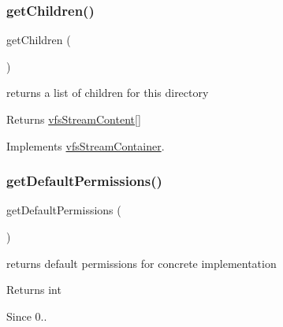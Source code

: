 \subsubsection{\texorpdfstring{get\+Children()}{getChildren()}}
{\footnotesize\ttfamily get\+Children (\begin{DoxyParamCaption}{ }\end{DoxyParamCaption})}

returns a list of children for this directory

\begin{DoxyReturn}{Returns}
\mbox{\hyperlink{interfaceorg_1_1bovigo_1_1vfs_1_1vfs_stream_content}{vfs\+Stream\+Content}}\mbox{[}\mbox{]} 
\end{DoxyReturn}


Implements \mbox{\hyperlink{interfaceorg_1_1bovigo_1_1vfs_1_1vfs_stream_container_a8650a4f6150ed357d88fa043f1685ac5}{vfs\+Stream\+Container}}.

\mbox{\label{classorg_1_1bovigo_1_1vfs_1_1vfs_stream_directory_a5a7e3863035fc9138bf0c7c486a472cb}} 
\subsubsection{\texorpdfstring{get\+Default\+Permissions()}{getDefaultPermissions()}}
{\footnotesize\ttfamily get\+Default\+Permissions (\begin{DoxyParamCaption}{ }\end{DoxyParamCaption})\hspace{0.3cm}{\ttfamily [protected]}}

returns default permissions for concrete implementation

\begin{DoxyReturn}{Returns}
int 
\end{DoxyReturn}
\begin{DoxySince}{Since}
0.. 
\end{DoxySince}
\mbox{\label{classorg_1_1bovigo_1_1vfs_1_1vfs_stream_directory_a7a9f937c2958e6f4dd7b030f86fb70b7}} 
